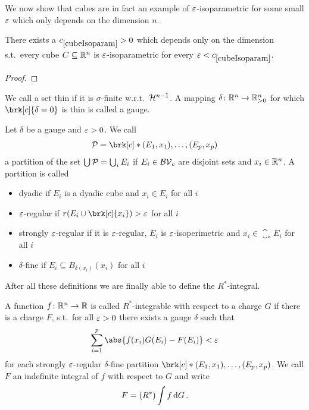 We now show that cubes are in fact an example of $\varepsilon$-isoparametric for some small $\varepsilon$ which only depends on the dimension $n$.
\begin{proposition}
There exists a $\useconstant{cubeIsoparam}>0$ which depends only on the dimension s.t.\ every cube $C\subseteq\mathbb{R}^n$ is $\varepsilon$-isoparametric for every $\e<\useconstant{cubeIsoparam}$.
\end{proposition}
\begin{proof}
\end{proof}

\begin{definition}[Gauge]
We call a set thin if it is $\sigma$-finite w.r.t.\ $\mathcal{H}^{n-1}$. A mapping $\delta\colon\mathbb{R}^n\to\mathbb{R}^n_{>0}$ for which $\brk[c]{\delta=0}$ is thin is called a gauge.
\end{definition}

\begin{definition}[Partitions]
Let $\delta$ be a gauge and $\varepsilon>0$.
We call
\begin{align*}
	\cP=\brk[c]*{(E_1,x_1),\dots, (E_p,x_p)}
\end{align*}
a partition of the set $\bigcup\mathcal{P}=\bigcup_iE_i$ if $E_i\in\mathcal{BV}_c$ are disjoint sets and $x_i\in\mathbb{R}^n$. A partition is called
\begin{itemize}
	\item dyadic if $E_i$ is a dyadic cube and $x_i\in E_i$ for all $i$
	\item $\varepsilon$-regular if $r(E_i\cup\brk[c]{x_i})>\e$ for all $i$
	\item strongly $\varepsilon$-regular if it is $\varepsilon$-regular, $E_i$ is $\varepsilon$-isoperimetric and $x_i\in\closure_*E_i$ for all $i$
	\item $\delta$-fine if $E_i\subseteq B_{\delta(x_i)}(x_i)$ for all $i$
\end{itemize}
\end{definition}

After all these definitions we are finally able to define the $R^*$-integral.

\begin{definition}[$R^*$-integral]
A function $f\colon \mathbb{R}^n\to\mathbb{R}$ is called $R^*$-integrable with respect to a charge $G$ if there is a charge $F$, s.t.\ for all $\varepsilon>0$ there exists a gauge $\delta$ such that
\begin{align*}
	\sum_{i=1}^p\abs{f(x_i)G(E_i)-F(E_i)}<\e
\end{align*}
for each strongly $\varepsilon$-regular $\delta$-fine partition $\brk[c]*{(E_1,x_1),\dots,(E_p,x_p)}$. We call $F$ an indefinite integral of $f$ with respect to $G$ and write
\begin{align*}
	F=(R^*)\int f\,\mathrm{d} G\,.
\end{align*}
\end{definition}


